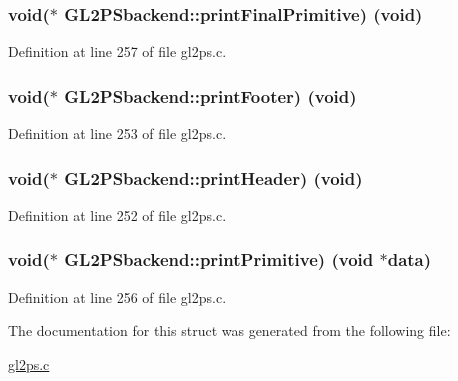 \hypertarget{struct_g_l2_p_sbackend_a02d35954f42088ca83bdde31d63a2bb2}{}
\subsubsection[{print\+Final\+Primitive}]{\setlength{\rightskip}{0pt plus 5cm}void($\ast$ G\+L2\+P\+Sbackend\+::print\+Final\+Primitive) (void)}\label{struct_g_l2_p_sbackend_a02d35954f42088ca83bdde31d63a2bb2}


Definition at line 257 of file gl2ps.\+c.

\hypertarget{struct_g_l2_p_sbackend_ae7d08efe5024f7e407c63d116cb0ba14}{}
\subsubsection[{print\+Footer}]{\setlength{\rightskip}{0pt plus 5cm}void($\ast$ G\+L2\+P\+Sbackend\+::print\+Footer) (void)}\label{struct_g_l2_p_sbackend_ae7d08efe5024f7e407c63d116cb0ba14}


Definition at line 253 of file gl2ps.\+c.

\hypertarget{struct_g_l2_p_sbackend_afdd2bc2b0684ab6bda7f72ce1561bef9}{}
\subsubsection[{print\+Header}]{\setlength{\rightskip}{0pt plus 5cm}void($\ast$ G\+L2\+P\+Sbackend\+::print\+Header) (void)}\label{struct_g_l2_p_sbackend_afdd2bc2b0684ab6bda7f72ce1561bef9}


Definition at line 252 of file gl2ps.\+c.

\hypertarget{struct_g_l2_p_sbackend_ac2d22418854178ec0e962f684ff3f27e}{}
\subsubsection[{print\+Primitive}]{\setlength{\rightskip}{0pt plus 5cm}void($\ast$ G\+L2\+P\+Sbackend\+::print\+Primitive) (void $\ast$data)}\label{struct_g_l2_p_sbackend_ac2d22418854178ec0e962f684ff3f27e}


Definition at line 256 of file gl2ps.\+c.



The documentation for this struct was generated from the following file\+:\begin{DoxyCompactItemize}
\item 
\hyperlink{gl2ps_8c}{gl2ps.\+c}\end{DoxyCompactItemize}
